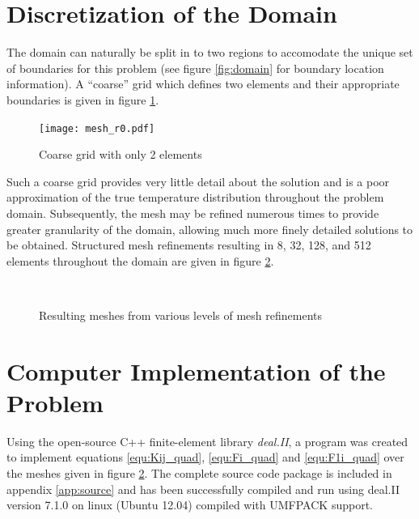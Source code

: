 \documentclass[letterpaper,10pt]{article}
\begin{document}
\section{Discretization of the Domain}
The domain can naturally be split in to two regions to accomodate the unique set of boundaries for this problem (see figure \ref{fig:domain} for boundary location information). A ``coarse'' grid which defines two elements and their appropriate boundaries is given in figure \ref{fig:grid_r0}.

\begin{figure}[H]
	\centering
	\texttt{[image: mesh\_r0.pdf]}
	\caption{Coarse grid with only 2 elements}
	\label{fig:grid_r0}
\end{figure}

Such a coarse grid provides very little detail about the solution and is a poor approximation of the true temperature distribution throughout the problem domain. Subsequently, the mesh may be refined numerous times to provide greater granularity of the domain, allowing much more finely detailed solutions to be obtained. Structured mesh refinements resulting in 8, 32, 128, and 512 elements throughout the domain are given in figure \ref{fig:meshs}.

\begin{figure}[H]
	\centering
	 \;
	 \\
	 \;
	\caption{Resulting meshes from various levels of mesh refinements}
	\label{fig:meshs}
\end{figure}

\section{Computer Implementation of the Problem}
Using the open-source C++ finite-element library \emph{deal.II}, a program was created to implement equations \ref{equ:Kij_quad}, \ref{equ:Fi_quad} and \ref{equ:F1i_quad} over the meshes given in figure \ref{fig:meshs}. The complete source code package is included in appendix \ref{app:source} and has been successfully compiled and run using deal.II version 7.1.0 on linux (Ubuntu 12.04) compiled with UMFPACK support.
\end{document}
